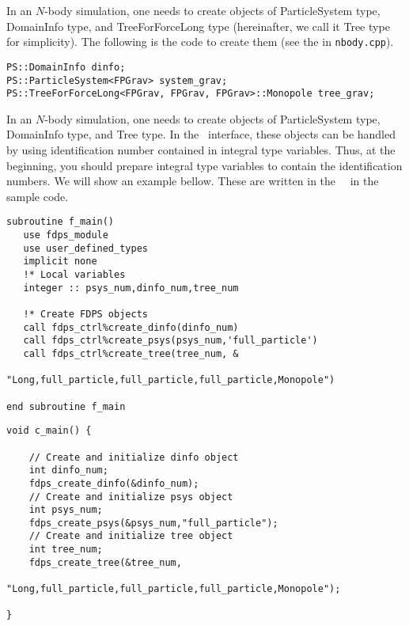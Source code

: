\ifCpp %
In an $N$-body simulation, one needs to create objects of \textsf{ParticleSystem} type, \textsf{DomainInfo} type, and \textsf{TreeForForceLong} type (hereinafter, we call it \textsf{Tree} type for simplicity). The following is the code to create them (see the \mainFunc in \texttt{nbody.cpp}).
\begin{lstlisting}[caption=Creation of FDPS objects]
PS::DomainInfo dinfo;
PS::ParticleSystem<FPGrav> system_grav;
PS::TreeForForceLong<FPGrav, FPGrav, FPGrav>::Monopole tree_grav;
\end{lstlisting}
\endifCpp
\ifIF %
In an $N$-body simulation, one needs to create objects of \textsf{ParticleSystem} type, \textsf{DomainInfo} type, and \textsf{Tree} type. In the \progLangName\ interface, these objects can be handled by using identification number contained in integral type variables. Thus, at the beginning, you should prepare integral type variables to contain the identification numbers. We will show an example bellow. These are written in the \mainFunc\ \fileNameOfMainFunc\ in the sample code.
\endifIF
\ifFtn %
\begin{lstlisting}[caption=Creation of FDPS objects]
subroutine f_main()
   use fdps_module
   use user_defined_types
   implicit none
   !* Local variables
   integer :: psys_num,dinfo_num,tree_num
   
   !* Create FDPS objects
   call fdps_ctrl%create_dinfo(dinfo_num)
   call fdps_ctrl%create_psys(psys_num,'full_particle')
   call fdps_ctrl%create_tree(tree_num, &
                              "Long,full_particle,full_particle,full_particle,Monopole")

end subroutine f_main
\end{lstlisting}
\endifFtn
\ifC %
\begin{lstlisting}[caption=Creation of FDPS objects]
void c_main() {
   
    // Create and initialize dinfo object
    int dinfo_num;
    fdps_create_dinfo(&dinfo_num);
    // Create and initialize psys object
    int psys_num;
    fdps_create_psys(&psys_num,"full_particle");
    // Create and initialize tree object
    int tree_num;
    fdps_create_tree(&tree_num,
                     "Long,full_particle,full_particle,full_particle,Monopole");

}
\end{lstlisting}
\endifC
{}

